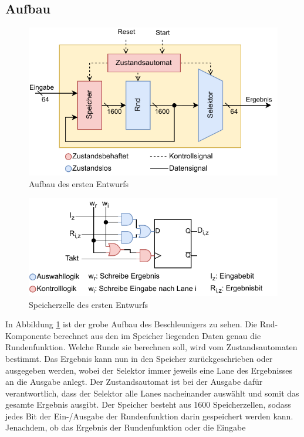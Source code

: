 \subsection{Aufbau}
\begin{figure}
    \center
    \includegraphics{images/Iteration_1.pdf}
    \caption{Aufbau des ersten Entwurfs}
    \label{fig:aufbau_iteration_1}
\end{figure}
\begin{figure}
    \center
    \includegraphics{images/Iteration_1_Speicher.pdf}
    \caption{Speicherzelle des ersten Entwurfs}
    \label{fig:speicher_iteration_1}
\end{figure}
In Abbildung \ref{fig:aufbau_iteration_1} ist der grobe Aufbau des Beschleunigers zu sehen. Die Rnd-Komponente berechnet aus den im Speicher liegenden Daten genau die Rundenfunktion.
Welche Runde sie berechnen soll, wird vom Zustandsautomaten bestimmt. Das Ergebnis kann nun in den Speicher zurückgeschrieben oder ausgegeben werden,
wobei der Selektor immer jeweils eine Lane des Ergebnisses an die Ausgabe anlegt. Der Zustandsautomat ist bei der Ausgabe dafür verantwortlich,
dass der Selektor alle Lanes nacheinander auswählt und somit das gesamte Ergebnis ausgibt. Der Speicher besteht aus 1600 Speicherzellen,
sodass jedes Bit der Ein-/Ausgabe der Rundenfunktion darin gespeichert werden kann. Jenachdem, ob das Ergebnis der Rundenfunktion oder die Eingabe

